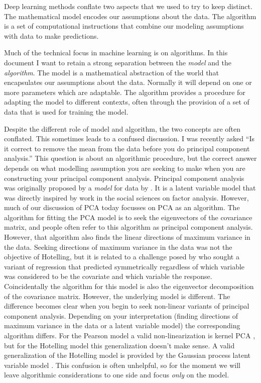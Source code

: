 \documentclass[a4paperpaper,]{article}
\begin{document}
Deep learning methods conflate two
aspects that we used to try to keep distinct. The mathematical model
encodes our assumptions about the data. The algorithm is a set of
computational instructions that combine our modeling assumptions with
data to make predictions.

Much of the technical focus in machine learning is on algorithms. In
this document I want to retain a strong separation between the
\emph{model} and the \emph{algorithm}. The model is a mathematical
abstraction of the world that encapsulates our assumptions about the
data. Normally it will depend on one or more parameters which are
adaptable. The algorithm provides a procedure for adapting the model to
different contexts, often through the provision of a set of data that is
used for training the model.

Despite the different role of model and algorithm, the two concepts are
often conflated. This sometimes leads to a confused discussion. I was
recently asked ``Is it correct to remove the mean from the data before
you do principal component analysis.'' This question is about an
algorithmic procedure, but the correct answer depends on what modelling
assumption you are seeking to make when you are constructing your
principal component analysis. Principal component analysis was
originally proposed by a \emph{model} for data by
\citep{Hotelling:analysis33}. It is a latent variable model that was
directly inspired by work in the social sciences on factor analysis.
However, much of our discussion of PCA today focusses on PCA as an
algorithm. The algorithm for fitting the PCA model is to seek the
eigenvectors of the covariance matrix, and people often refer to this
algorithm as principal component analysis. However, that algorithm also
finds the linear directions of maximum variance in the data. Seeking
directions of maximum variance in the data was not the objective of
Hotelling, but it is related to a challenge posed by \citet{Pearson:01}
who sought a variant of regression that predicted symmetrically
regardless of which variable was considered to be the covariate and
which variable the response. Coincidentally the algorithm for this model
is also the eigenvector decomposition of the covariance matrix. However,
the underlying model is different. The difference becomes clear when you
begin to seek non-linear variants of principal component analysis.
Depending on your interpretation (finding directions of maximum variance
in the data or a latent variable model) the corresponding algorithm
differs. For the Pearson model a valid non-linearization is kernel PCA
\citep{Scholkopf:nonlinear98}, but for the Hotelling model this
generalization doesn't make sense. A valid generalization of the
Hotelling model is provided by the Gaussian process latent variable
model \citep{Lawrence:pnpca05}. This confusion is often unhelpful, so
for the moment we will leave algorithmic considerations to one side and
focus \emph{only} on the model.
\end{document}
